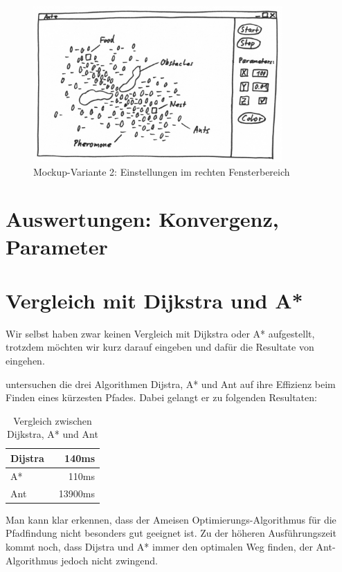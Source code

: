 \begin{figure}[h]
  \centering
	\includegraphics [width=0.85\textwidth]{images/Antz_Mockup_2_sw.png} 
	\caption{Mockup-Variante 2: Einstellungen im rechten Fensterbereich}
\end{figure}

\section{Auswertungen: Konvergenz, Parameter}

\section{Vergleich mit Dijkstra und A*}

Wir selbst haben zwar keinen Vergleich mit Dijkstra oder A* aufgestellt, trotzdem möchten wir kurz darauf eingeben und dafür die Resultate von \citet*{leo-perf} eingehen.

\citeauthor*{leo-perf} untersuchen die drei Algorithmen Dijstra, A* und Ant auf ihre Effizienz beim Finden eines kürzesten Pfades. Dabei gelangt er zu folgenden Resultaten:

\begin{table}[h]
\begin{tabular}{ | l | r | }
\hline
Dijstra & ~140ms \\
\hline
A* & ~110ms \\
\hline
Ant & ~13900ms \\
\hline
\end{tabular}
\caption{Vergleich zwischen Dijkstra, A* und Ant}
\end{table}

Man kann klar erkennen, dass der Ameisen Optimierungs-Algorithmus für die Pfadfindung nicht besonders gut geeignet ist. Zu der höheren Ausführungszeit kommt noch, dass Dijstra und A* immer den optimalen Weg finden, der Ant-Algorithmus jedoch nicht zwingend.

